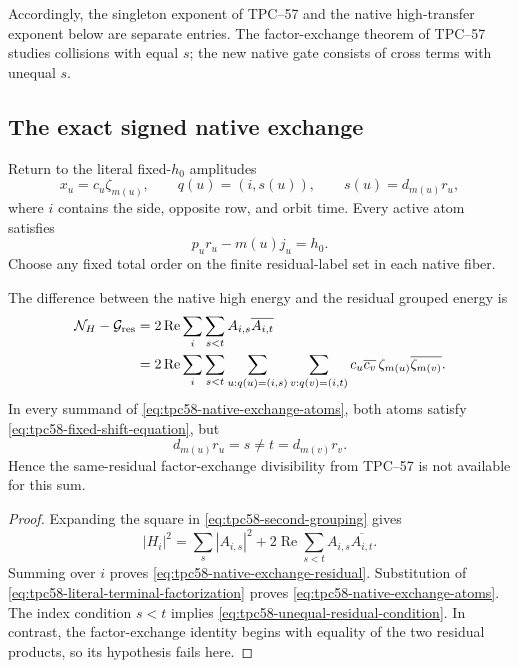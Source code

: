Accordingly, the singleton exponent of TPC--57 and the native high-transfer
exponent below are separate entries.  The factor-exchange theorem of
TPC--57 studies collisions with equal \(s\); the new native gate consists of
cross terms with unequal \(s\).

\subsection{The exact signed native exchange}

Return to the literal fixed-\(h_0\) amplitudes
\begin{equation}
 x_u=c_u\zeta_{m(u)},
 \qquad
 q(u)=(i,s(u)),
 \qquad
 s(u)=d_{m(u)}r_u,
 \label{eq:tpc58-literal-terminal-factorization}
\end{equation}
where \(i\) contains the side, opposite row, and orbit time.  Every active
atom satisfies
\begin{equation}
 p_ur_u-m(u)j_u=h_0.
 \label{eq:tpc58-fixed-shift-equation}
\end{equation}
Choose any fixed total order on the finite residual-label set in each native
fiber.

\begin{proposition}
\label{prop:tpc58-native-exchange-identity}
The difference between the native high energy and the residual grouped
energy is
\begin{align}
 \mathcal N_H-\mathcal G_{\rm res}
 &=2\operatorname{Re}
   \sum_i\sum_{s<t}A_{i,s}\overline{A_{i,t}}
 \label{eq:tpc58-native-exchange-residual}\\
 &=2\operatorname{Re}
   \sum_i\sum_{s<t}
   \sum_{\substack{u:q(u)=(i,s)}}
   \sum_{\substack{v:q(v)=(i,t)}}
   c_u\overline{c_v}\,
   \zeta_{m(u)}\overline{\zeta_{m(v)}}.
 \label{eq:tpc58-native-exchange-atoms}
\end{align}
In every summand of \eqref{eq:tpc58-native-exchange-atoms}, both atoms
satisfy \eqref{eq:tpc58-fixed-shift-equation}, but
\begin{equation}
 d_{m(u)}r_u=s\ne t=d_{m(v)}r_v.
 \label{eq:tpc58-unequal-residual-condition}
\end{equation}
Hence the same-residual factor-exchange divisibility from TPC--57 is not
available for this sum.
\end{proposition}

\begin{proof}
Expanding the square in \eqref{eq:tpc58-second-grouping} gives
\[
 |H_i|^2
 =\sum_s|A_{i,s}|^2
  +2\operatorname{Re}\sum_{s<t}A_{i,s}\overline{A_{i,t}}.
\]
Summing over \(i\) proves \eqref{eq:tpc58-native-exchange-residual}.
Substitution of \eqref{eq:tpc58-literal-terminal-factorization} proves
\eqref{eq:tpc58-native-exchange-atoms}.  The index condition \(s<t\)
implies \eqref{eq:tpc58-unequal-residual-condition}.  In contrast, the
factor-exchange identity begins with equality of the two residual products,
so its hypothesis fails here.
\end{proof}

